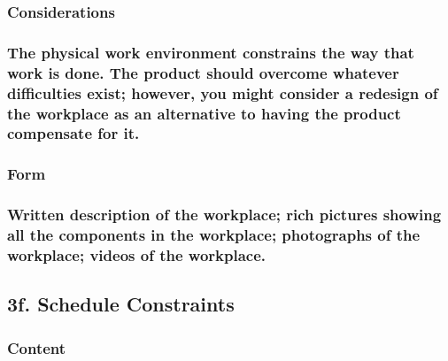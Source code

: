 \documentclass[
]{article}
\begin{document}
\hypertarget{considerations-6}{%
\subsubsection{Considerations}\label{considerations-6}}

\hypertarget{the-physical-work-environment-constrains-the-way-that-work-is-done.-the-product-should-overcome-whatever-difficulties-exist-however-you-might-consider-a-redesign-of-the-workplace-as-an-alternative-to-having-the-product-compensate-for-it.}{%
\subsubsection{The physical work environment constrains the way that
work is done. The product should overcome whatever difficulties exist;
however, you might consider a redesign of the workplace as an
alternative to having the product compensate for
it.}\label{the-physical-work-environment-constrains-the-way-that-work-is-done.-the-product-should-overcome-whatever-difficulties-exist-however-you-might-consider-a-redesign-of-the-workplace-as-an-alternative-to-having-the-product-compensate-for-it.}}

\hypertarget{form-14}{%
\subsubsection{Form}\label{form-14}}

\hypertarget{written-description-of-the-workplace-rich-pictures-showing-all-the-components-in-the-workplace-photographs-of-the-workplace-videos-of-the-workplace.}{%
\subsubsection{Written description of the workplace; rich pictures
showing all the components in the workplace; photographs of the
workplace; videos of the
workplace.}\label{written-description-of-the-workplace-rich-pictures-showing-all-the-components-in-the-workplace-photographs-of-the-workplace-videos-of-the-workplace.}}

\hypertarget{f.-schedule-constraints}{%
\subsection{\texorpdfstring{3f. Schedule Constraints
}{3f. Schedule Constraints }}\label{f.-schedule-constraints}}

\hypertarget{content-15}{%
\subsubsection{Content}\label{content-15}}
\end{document}
